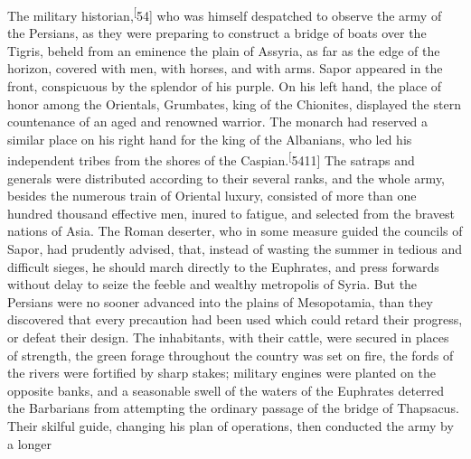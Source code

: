 

The military historian,\textsuperscript[54] who was himself despatched to observe
the army of the Persians, as they were preparing to construct a
bridge of boats over the Tigris, beheld from an eminence the
plain of Assyria, as far as the edge of the horizon, covered with
men, with horses, and with arms. Sapor appeared in the front,
conspicuous by the splendor of his purple. On his left hand, the
place of honor among the Orientals, Grumbates, king of the
Chionites, displayed the stern countenance of an aged and
renowned warrior. The monarch had reserved a similar place on his
right hand for the king of the Albanians, who led his independent
tribes from the shores of the Caspian.\textsuperscript[5411] The satraps and
generals were distributed according to their several ranks, and
the whole army, besides the numerous train of Oriental luxury,
consisted of more than one hundred thousand effective men, inured
to fatigue, and selected from the bravest nations of Asia. The
Roman deserter, who in some measure guided the councils of Sapor,
had prudently advised, that, instead of wasting the summer in
tedious and difficult sieges, he should march directly to the
Euphrates, and press forwards without delay to seize the feeble
and wealthy metropolis of Syria. But the Persians were no sooner
advanced into the plains of Mesopotamia, than they discovered
that every precaution had been used which could retard their
progress, or defeat their design. The inhabitants, with their
cattle, were secured in places of strength, the green forage
throughout the country was set on fire, the fords of the rivers
were fortified by sharp stakes; military engines were planted on
the opposite banks, and a seasonable swell of the waters of the
Euphrates deterred the Barbarians from attempting the ordinary
passage of the bridge of Thapsacus. Their skilful guide, changing
his plan of operations, then conducted the army by a longer
